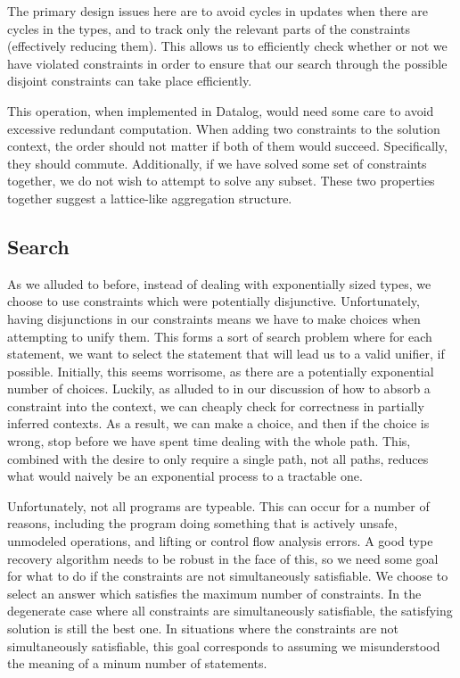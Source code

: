 The primary design issues here are to avoid cycles in updates when there are cycles in the types, and to track only the relevant parts of the constraints (effectively reducing them). This allows us to efficiently check whether or not we have violated constraints in order to ensure that our search through the possible disjoint constraints can take place efficiently.

This operation, when implemented in Datalog, would need some care to avoid excessive redundant computation.
When adding two constraints to the solution context, the order should not matter if both of them would succeed.
Specifically, they should commute.
Additionally, if we have solved some set of constraints together, we do not wish to attempt to solve any subset.
These two properties together suggest a lattice-like aggregation structure.

\subsection{Search}
As we alluded to before, instead of dealing with exponentially sized types, we choose to use constraints which were potentially disjunctive. Unfortunately, having disjunctions in our constraints means we have to make choices when attempting to unify them. This forms a sort of search problem where for each statement, we want to select the statement that will lead us to a valid unifier, if possible. Initially, this seems worrisome, as there are a potentially exponential number of choices. Luckily, as alluded to in our discussion of how to absorb a constraint into the context, we can cheaply check for correctness in partially inferred contexts. As a result, we can make a choice, and then if the choice is wrong, stop before we have spent time dealing with the whole path. This, combined with the desire to only require a single path, not all paths, reduces what would naively be an exponential process to a tractable one.

Unfortunately, not all programs are typeable. This can occur for a number of reasons, including the program doing something that is actively unsafe, unmodeled operations, and lifting or control flow analysis errors. A good type recovery algorithm needs to be robust in the face of this, so we need some goal for what to do if the constraints are not simultaneously satisfiable. We choose to select an answer which satisfies the maximum number of constraints. In the degenerate case where all constraints are simultaneously satisfiable, the satisfying solution is still the best one.
In situations where the constraints are not simultaneously satisfiable, this goal corresponds to assuming we misunderstood the meaning of a minum number of statements.


